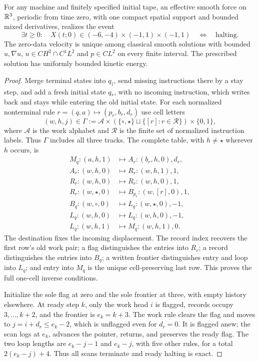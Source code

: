 \begin{theorem}\label{thm:bb-two-pass-parking}
For any machine and finitely specified initial tape, an effective
smooth force on $\mathbb R^3$, periodic from time zero, with one compact
spatial support and bounded mixed derivatives, realizes the event
\[
 \exists t\ge0:\quad X(t;0)\in(-6,-4)\times(-1,1)\times(-1,1)
 \quad\Longleftrightarrow\quad\text{halting}.
\]
The zero-data velocity is unique among classical smooth solutions
with bounded $u,\nabla u$, $u\in C H^2\cap C^1L^2$ and $p\in C L^2$
on every finite interval.  The prescribed solution has uniformly
bounded kinetic energy.
\end{theorem}
\begin{proof}\label{proof:bb-two-pass-parking}
Merge terminal states into $q_\dagger$, send missing instructions
there by a stay step, and add a fresh initial state $q_*$, with no
incoming instruction, which writes back and stays while entering
the old initial state.  For each normalized nonterminal rule
$r=(q,a)\mapsto(p_r,b_r,d_r)$ use cell letters
\[
 (w,h,j)\in\Gamma:=\mathcal A\times
 (\{\circ,\star\}\sqcup\{[r]:r\in\mathcal R\})\times\{0,1\},
\]
where $\mathcal A$ is the work alphabet and $\mathcal R$ is the
finite set of normalized instruction labels. Thus $\Gamma$ includes
all three tracks.
The complete table, with $h\ne\star$ wherever $h$ occurs, is
\[
\begin{array}{lll}
 M_q:(a,h,1)&\mapsto A_r:(b_r,h,0),d_r,\\
 A_r:(w,h,0)&\mapsto R_r:(w,h,1),1,\\
 R_r:(w,h,0)&\mapsto R_r:(w,h,0),1,\\
 R_r:(w,\star,0)&\mapsto B_{p_r}:(w,[r],0),1,\\
 B_q:(w,\circ,0)&\mapsto L_q:(w,\star,0),-1,\\
 L_q:(w,h,0)&\mapsto L_q:(w,h,0),-1,\\
 L_q:(w,h,1)&\mapsto M_q:(w,h,1),0.
\end{array}
\]
The destination fixes the incoming displacement.  The record index
recovers the first row's old work pair; a flag distinguishes the
entries into $R_r$; a record distinguishes the entries into $B_q$;
a written frontier distinguishes entry and loop into $L_q$;
and entry into $M_q$ is the unique cell-preserving last row.
This proves the full one-cell inverse conditions.

Initialize the sole flag at zero and the sole frontier at three,
with empty history elsewhere.  At ready step $k$, only the work
head $i$ is flagged, records occupy $3,\ldots,k+2$, and the frontier
is $e_k=k+3$.  The work rule clears the flag and moves to
$j=i+d_r\le e_k-2$, which is unflagged even for $d_r=0$.
It is flagged anew; the scan logs at $e_k$, advances the pointer,
returns, and preserves the ready flag.  The two loop lengths are
$e_k-j-1$ and $e_k-j$, with five other rules, for a total
$2(e_k-j)+4$.  Thus all scans terminate and ready halting is exact.


\end{proof}

